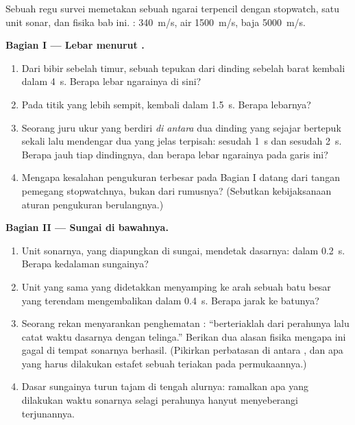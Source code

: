 \begin{problem}\label{pb:g7:sound-production:1}
Sebuah regu survei memetakan sebuah ngarai terpencil dengan stopwatch,
satu unit sonar, dan fisika bab ini. : 
\qty{340}{m/s}, air \qty{1500}{m/s}, baja \qty{5000}{m/s}.

\medskip\noindent\textbf{Bagian I --- Lebar menurut .}
\begin{enumerate}
  \item Dari bibir sebelah timur,  sebuah tepukan dari dinding
        sebelah barat kembali dalam \qty{4}{s}. Berapa lebar
        ngarainya di sini?
  \item Pada titik yang lebih sempit,  kembali dalam
        \qty{1.5}{s}. Berapa lebarnya?
  \item Seorang juru ukur yang berdiri \emph{di antara} dua dinding
        yang sejajar bertepuk sekali lalu mendengar dua  yang
        jelas terpisah: sesudah \qty{1}{s} dan sesudah \qty{2}{s}.
        Berapa jauh tiap dindingnya, dan berapa lebar ngarainya pada
        garis ini?
  \item Mengapa kesalahan pengukuran terbesar pada Bagian I datang
        dari tangan pemegang stopwatchnya, bukan dari rumusnya?
        (Sebutkan kebijaksanaan aturan pengukuran berulangnya.)
\end{enumerate}

\medskip\noindent\textbf{Bagian II --- Sungai di bawahnya.}
\begin{enumerate}[resume]
  \item Unit sonarnya, yang diapungkan di sungai, mendetak dasarnya:
         dalam \qty{0.2}{s}. Berapa kedalaman sungainya?
  \item Unit yang sama yang didetakkan menyamping ke arah sebuah batu
        besar yang terendam mengembalikan  dalam \qty{0.4}{s}.
        Berapa jarak ke batunya?
  \item Seorang rekan menyarankan penghematan : ``berteriaklah
        dari perahunya lalu catat waktu  dasarnya dengan
        telinga.'' Berikan dua alasan fisika mengapa ini gagal di
        tempat sonarnya berhasil. (Pikirkan perbatasan di antara
        , dan apa yang harus dilakukan estafet  sebuah
        teriakan pada permukaannya.)
  \item Dasar sungainya turun tajam di tengah alurnya: ramalkan apa
        yang dilakukan waktu  sonarnya selagi perahunya hanyut
        menyeberangi terjunannya.
\end{enumerate}


\end{problem}
